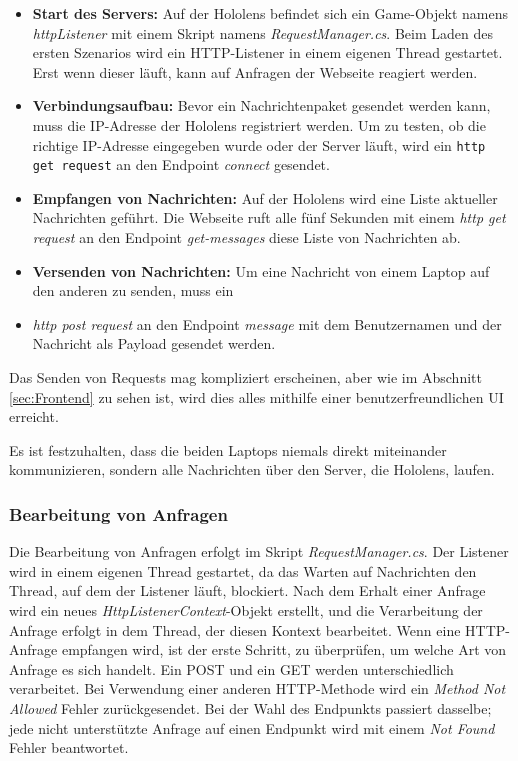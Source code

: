 \begin{itemize}
    \item \textbf{Start des Servers:} Auf der Hololens befindet sich ein Game-Objekt namens \textit{httpListener} mit einem
    Skript namens \textit{RequestManager.cs}. Beim Laden des ersten Szenarios wird ein HTTP-Listener in einem eigenen Thread
    gestartet. Erst wenn dieser läuft, kann auf Anfragen der Webseite reagiert werden.
    \item \textbf{Verbindungsaufbau:} Bevor ein Nachrichtenpaket gesendet werden kann, muss die IP-Adresse der Hololens
    registriert werden. Um zu testen, ob die richtige IP-Adresse eingegeben wurde oder der Server läuft, wird ein
    \texttt{http get request} an den Endpoint \textit{connect} gesendet.
    \item \textbf{Empfangen von Nachrichten:} Auf der Hololens wird eine Liste aktueller Nachrichten geführt. Die Webseite
    ruft alle fünf Sekunden mit einem \textit{http get request} an den Endpoint \textit{get-messages} diese Liste von Nachrichten ab.
    \item \textbf{Versenden von Nachrichten:} Um eine Nachricht von einem Laptop auf den anderen zu senden, muss ein
    \item \textit{http post request} an den Endpoint \textit{message} mit dem Benutzernamen und der Nachricht als Payload gesendet werden.
\end{itemize}

Das Senden von Requests mag kompliziert erscheinen, aber wie im Abschnitt \ref{sec:Frontend} zu sehen ist, wird dies
alles mithilfe einer benutzerfreundlichen UI erreicht.

Es ist festzuhalten, dass die beiden Laptops niemals direkt miteinander kommunizieren, sondern alle Nachrichten über den
Server, die Hololens, laufen.

\subsubsection{Bearbeitung von Anfragen}
Die Bearbeitung von Anfragen erfolgt im Skript \textit{RequestManager.cs}. Der Listener wird in einem eigenen Thread
gestartet, da das Warten auf Nachrichten den Thread, auf dem der Listener läuft, blockiert. Nach dem Erhalt einer Anfrage
wird ein neues \textit{HttpListenerContext}-Objekt erstellt, und die Verarbeitung der Anfrage erfolgt in dem Thread, der
diesen Kontext bearbeitet. Wenn eine HTTP-Anfrage empfangen wird, ist der erste Schritt, zu überprüfen, um welche Art von
Anfrage es sich handelt. Ein POST und ein GET werden unterschiedlich verarbeitet. Bei Verwendung einer anderen HTTP-Methode
wird ein \textit{Method Not Allowed} Fehler zurückgesendet. Bei der Wahl des Endpunkts passiert dasselbe; jede nicht
unterstützte Anfrage auf einen Endpunkt wird mit einem \textit{Not Found} Fehler beantwortet.

